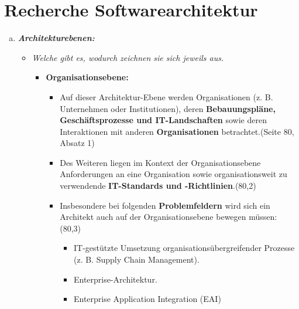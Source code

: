 

\newcommand{\dozent}{Lutz Prechelt}
\newcommand{\tutor}{Samuel Domiks}
\newcommand{\tutoriumNo}{02\\Materialien: Latex, Skript}
\newcommand{\ubungNo}{07}
\newcommand{\veranstaltung}{Softwaretechnik}
\newcommand{\semester}{SoSe21}
\newcommand{\studenten}{Jonny Lam \& Thore Brehmer}




\section{Recherche Softwarearchitektur}
\begin{enumerate}[(a)]
    \item {\itshape \textbf{Architekturebenen:}}
    \begin{itemize}
        \item {\itshape Welche gibt es, wodurch zeichnen sie sich jeweils aus.}
        \begin{itemize}
            \item \textbf{Organisationsebene:}
            \begin{itemize}
                \item Auf dieser Architektur-Ebene werden Organisationen (z. B. Unternehmen oder Institutionen), deren \textbf{Bebauungspläne, Geschäftsprozesse und IT-Landschaften} sowie deren Interaktionen mit anderen \textbf{Organisationen} betrachtet.(Seite 80, Absatz 1)
                \item Des Weiteren liegen im Kontext der Organisationsebene Anforderungen an eine Organisation sowie organisationsweit zu verwendende \textbf{IT-Standards und -Richtlinien}.(80,2)
                \item Insbesondere bei folgenden \textbf{Problemfeldern} wird sich ein Architekt auch auf der Organisationsebene bewegen müssen: (80,3)
                \begin{itemize}
                    \item IT-gestützte Umsetzung organisationsübergreifender Prozesse (z. B. Supply Chain Management).
                    \item Enterprise-Architektur.
                    \item Enterprise Application Integration (EAI)
                \end{itemize}
            \end{itemize} 



\end{itemize}
\end{itemize}
\end{enumerate}

